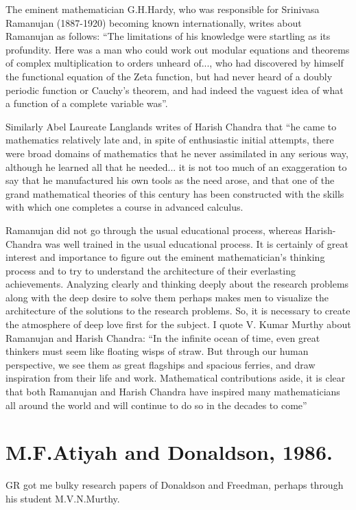 The eminent mathematician G.H.Hardy, who was responsible for Srinivasa Ramanujan (1887-1920) becoming known internationally, writes about Ramanujan as follows: “The limitations of his knowledge were startling as its profundity. Here was a man who could work out modular equations and theorems of complex   multiplication to orders unheard of..., who had discovered by himself the functional equation of the Zeta function, but had never heard of a doubly periodic function or Cauchy’s theorem,  and had indeed the vaguest idea of what a function of a complete variable was”.
 
Similarly Abel Laureate Langlands \cite{chap13-key06RPL} writes of Harish Chandra that “he came to mathematics relatively late and, in spite of enthusiastic initial attempts, there were broad domains of mathematics that he never assimilated in any serious way, although he learned all that he needed... it is not too much of an exaggeration to say that he manufactured his own tools as the need arose, and that one of the grand mathematical theories of this century has been constructed with the skills with which one completes a course in advanced calculus.
 
Ramanujan did not go through the usual educational process, whereas Harish-Chandra was well trained in the usual educational process.  It is certainly of great interest and importance to figure out the eminent mathematician’s thinking process and to try to understand the architecture of their everlasting achievements. Analyzing clearly and thinking deeply about the research problems along with the deep desire to solve them perhaps makes men to visualize the architecture of the solutions to the research problems. So, it is necessary to create the atmosphere of deep love first for the subject.  I quote V. Kumar Murthy about Ramanujan and Harish Chandra: “In the infinite ocean of time, even great thinkers must seem like floating wisps of straw. But through our human perspective, we see them as great flagships and spacious ferries, and draw inspiration from their life and work. Mathematical contributions aside, it is clear that both Ramanujan and Harish Chandra have inspired many mathematicians all around the world and will continue to do so in the decades to come”
 
\section*{M.F.Atiyah and Donaldson, 1986.}

GR got me bulky research papers of Donaldson and Freedman, perhaps through his student M.V.N.Murthy.
  
